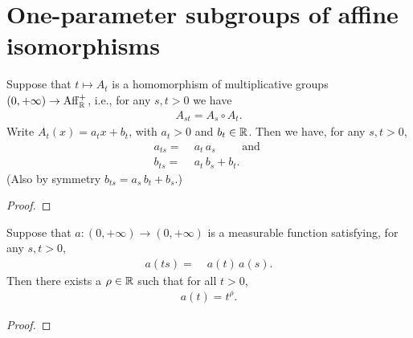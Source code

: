 \chapter{One-parameter subgroups of affine isomorphisms}



\begin{lemma}
  \label{lem:affine-one-parameter-subgroup-functional-eqn}
  Suppose that $t \mapsto A_t$ is a homomorphism of multiplicative groups
  $(0,+\infty) \to \mathrm{Aff}^+_{\mathbb{R}}$, i.e., for any $s, t > 0$ we have
  \begin{align*}
    A_{s t} = A_s \circ A_t .
  \end{align*}
  Write $A_t(x) = a_t x + b_t$, with $a_t > 0$ and $b_t \in \mathbb{R}$.
  Then we have, for any $s, t > 0$,
  \begin{align*}
    a_{t s} = \; & a_t \, a_s
      \qquad \text{ and } \\
    b_{t s} = \; & a_t \, b_s + b_t .
  \end{align*}
  (Also by symmetry $b_{t s} = a_s \, b_t + b_s$.)
\end{lemma}
\begin{proof}
\end{proof}

\begin{lemma}
  \label{lem:solution-functional-eqn-scaling}
  Suppose that $a \colon (0,+\infty) \to (0,+\infty)$ is a
  measurable function satisfying, for any $s, t > 0$,
  \begin{align*}
    a(t s) = \; & a(t) \, a(s) .
  \end{align*}
  Then there exists a $\rho \in \mathbb{R}$ such that for all $t > 0$,
  \begin{align*}
    a(t) = t^{\rho} .
  \end{align*}
\end{lemma}
\begin{proof}
\end{proof}

